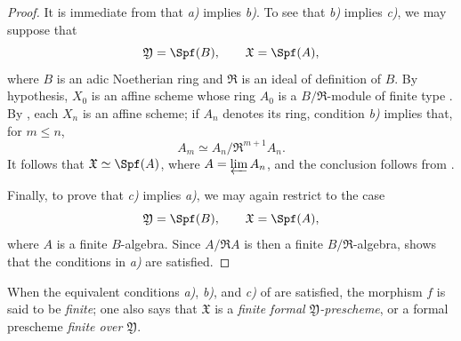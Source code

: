\begin{proof}
It is immediate from  that \emph{a)} implies
\emph{b)}.  To see that \emph{b)} implies \emph{c)}, we may suppose
that
\[
  \mathfrak{Y}=\Spf(B),\qquad \mathfrak{X}=\Spf(A),
\]
where $B$ is an adic Noetherian ring and $\mathfrak{R}$ is an ideal
of definition of $B$.  By hypothesis, $X_0$ is an affine scheme
whose ring $A_0$ is a $B/\mathfrak{R}$-module of finite type
.  By , each $X_n$ is an affine
scheme; if $A_n$ denotes its ring, condition \emph{b)} implies that,
for $m\leq n$,
\[
  A_m\simeq A_n/\mathfrak{R}^{m+1}A_n.
\]
It follows that $\mathfrak{X}\simeq\Spf(A)$, where
$A=\varprojlim A_n$, and the conclusion follows from
.

Finally, to prove that \emph{c)} implies \emph{a)}, we may again
restrict to the case
\[
  \mathfrak{Y}=\Spf(B),\qquad \mathfrak{X}=\Spf(A),
\]
where $A$ is a finite $B$-algebra.  Since
$A/\mathfrak{R}A$ is then a finite
$B/\mathfrak{R}$-algebra,  shows that the
conditions in \emph{a)} are satisfied.
\end{proof}

\begin{definition}[4.8.2]
\label{III.4.8.2}
When the equivalent conditions \emph{a)}, \emph{b)}, and \emph{c)}
of  are satisfied, the morphism $f$ is said to be
\emph{finite}; one also says that $\mathfrak{X}$ is a
\emph{finite formal $\mathfrak{Y}$-prescheme}, or a formal
prescheme \emph{finite over $\mathfrak{Y}$}.
\end{definition}

